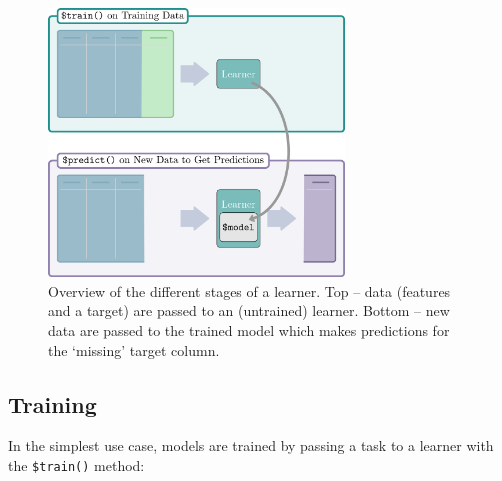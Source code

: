 \begin{figure}

{\centering \includegraphics[width=0.7\textwidth,height=\textheight]{chapters/chapter2/Figures/mlr3book_figures-2.png}

}

\caption{\label{fig-basics-learner}Overview of the different stages of a
learner. Top -- data (features and a target) are passed to an
(untrained) learner. Bottom -- new data are passed to the trained model
which makes predictions for the `missing' target column.}

\end{figure}

\hypertarget{sec-training}{%
\subsection{Training}\label{sec-training}}

In the simplest use case, models are trained by passing a task to a
learner with the
\texttt{\$train()}
method:

\begin{Shaded}
\begin{Highlighting}[]
\OtherTok{=} \NormalTok{(}\NormalTok{)}
\OtherTok{=} \NormalTok{(}\NormalTok{)}
\SpecialCharTok{$}
\end{Highlighting}
\end{Shaded}

